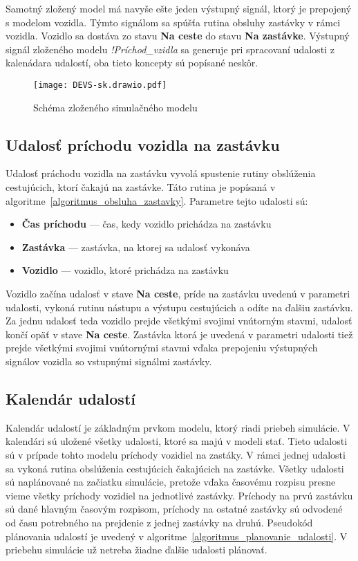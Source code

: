 Samotný zložený model má navyše ešte jeden výstupný signál, ktorý je prepojený s modelom vozidla.
Týmto signálom sa spúšťa rutina obsluhy zastávky v rámci vozidla.
Vozidlo sa dostáva zo stavu \textbf{Na ceste} do stavu \textbf{Na zastávke}.
Výstupný signál zloženého modelu \textit{!Príchod\_vzidla} sa generuje pri spracovaní udalosti z kalenádara udalostí, oba tieto koncepty sú popísané neskôr.

\begin{figure}[h]\label{fig:simulacny_model}
  \centering
  \texttt{[image: DEVS-sk.drawio.pdf]}
  \caption{Schéma zloženého simulačného modelu}
\end{figure}

\subsection*{Udalosť príchodu vozidla na zastávku}
Udalosť práchodu vozidla na zastávku vyvolá spustenie rutiny obslúženia cestujúcich, ktorí čakajú na zastávke. Táto rutina je popísaná v algoritme~\ref{algoritmus_obsluha_zastavky}.
Parametre tejto udalosti sú:
\begin{itemize}
  \item \textbf{Čas príchodu} --- čas, kedy vozidlo prichádza na zastávku
  \item \textbf{Zastávka} --- zastávka, na ktorej sa udalosť vykonáva
  \item \textbf{Vozidlo} --- vozidlo, ktoré prichádza na zastávku
\end{itemize}

Vozidlo začína udalosť v stave \textbf{Na ceste}, príde na zastávku uvedenú v parametri udalosti, vykoná rutinu nástupu a výstupu cestujúcich a odíte na ďalšiu zastávku.
Za jednu udalosť teda vozidlo prejde všetkými svojimi vnútorným stavmi, udalosť končí opäť v stave \textbf{Na ceste}.
Zastávka ktorá je uvedená v parametri udalosti tiež prejde všetkými svojimi vnútornými stavmi vďaka prepojeniu výstupných signálov vozidla so vstupnými signálmi zastávky.

\subsection*{Kalendár udalostí}
Kalendár udalostí je základným prvkom modelu, ktorý riadi priebeh simulácie.
V kalendári sú uložené všetky udalosti, ktoré sa majú v modeli stať.
Tieto udalosti sú v prípade tohto modelu príchody vozidiel na zastáky.
V rámci jednej udalosti sa vykoná rutina obslúženia cestujúcich čakajúcich na zastávke.
Všetky udalosti sú naplánované na začiatku simulácie, pretože vďaka časovému rozpisu presne vieme všetky príchody vozidiel na jednotlivé zastávky.
Príchody na prvú zastávku sú dané hlavným časovým rozpisom, príchody na ostatné zastávky sú odvodené od času potrebného na prejdenie z jednej zastávky na druhú.
Pseudokód plánovania udalostí je uvedený v algoritme~\ref{algoritmus_planovanie_udalosti}.
V priebehu simulácie už netreba žiadne ďalšie udalosti plánovať.

